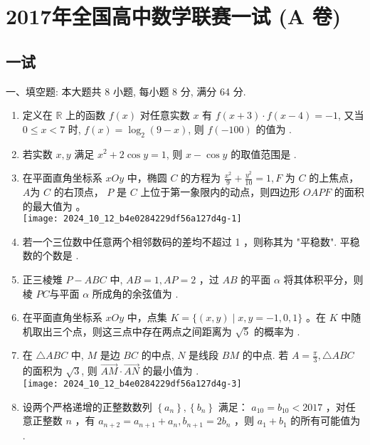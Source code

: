 \section*{2017年全国高中数学联赛一试 (A 卷)}

\subsection*{一试}

一、填空题: 本大题共 8 小题, 每小题 8 分, 满分 64 分.

\begin{enumerate}
  \item 定义在 $\mathbb{R}$ 上的函数 $f(x)$ 对任意实数 $x$ 有 $f(x+3) \cdot f(x-4)=-1$, 又当 $0 \leqslant x<7$ 时, $f(x)=\log _{2}(9-x)$, 则 $f(-100)$ 的值为 \underline{\hspace{2cm}} .
  \item 若实数 $x, y$ 满足 $x^{2}+2 \cos y=1$, 则 $x-\cos y$ 的取值范围是 \underline{\hspace{2cm}} .
  \item 在平面直角坐标系 $x O y$ 中，椭圆 $C$ 的方程为 $\frac{x^{2}}{9}+\frac{y^{2}}{10}=1, F$ 为 $C$ 的上焦点， $A$为 $C$ 的右顶点， $P$ 是 $C$ 上位于第一象限内的动点，则四边形 $O A P F$ 的面积的最大值为 \underline{\hspace{2cm}}。\\
\texttt{[image: 2024\_10\_12\_b4e0284229df56a127d4g-1]}
  \item 若一个三位数中任意两个相邻数码的差均不超过 1 ，则称其为 "平稳数". 平稳数的个数是 \underline{\hspace{2cm}} .
  \item 正三棱雉 $P-A B C$ 中, $A B=1, A P=2$ ，过 $A B$ 的平面 $\alpha$ 将其体积平分，则棱 $P C$与平面 $\alpha$ 所成角的余弦值为 \underline{\hspace{2cm}} .
  \item 在平面直角坐标系 $x O y$ 中，点集 $K=\{(x, y) \mid x, y=-1,0,1\}$ 。在 $K$ 中随机取出三个点，则这三点中存在两点之间距离为 $\sqrt{5}$ 的概率为 \underline{\hspace{2cm}} .
  \item 在 $\triangle A B C$ 中, $M$ 是边 $B C$ 的中点, $N$ 是线段 $B M$ 的中点. 若 $A=\frac{\pi}{3}, \triangle A B C$ 的面积为 $\sqrt{3}$, 则 $\overrightarrow{A M} \cdot \overrightarrow{A N}$ 的最小值为 \underline{\hspace{2cm}} .\\
\texttt{[image: 2024\_10\_12\_b4e0284229df56a127d4g-3]}
  \item 设两个严格递增的正整数数列 $\left\{a_{n}\right\},\left\{b_{n}\right\}$ 满足： $a_{10}=b_{10}<2017$ ，对任意正整数 $n$ ，有 $a_{n+2}=a_{n+1}+a_{n}, b_{n+1}=2 b_{n}$ ，则 $a_{1}+b_{1}$ 的所有可能值为 \underline{\hspace{2cm}} .
\end{enumerate}

